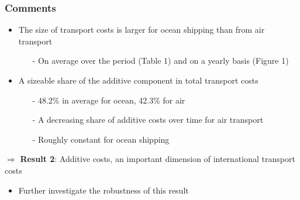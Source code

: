 \documentclass[10 pt,Helvetica, french]{beamer}
\begin{document}
\begin{frame}[label=slide_comments_fig1]
\frametitle{Comments}
\begin{itemize}
\item The size of transport costs is larger for ocean shipping than from air transport \vspace{0.1cm}
\begin{itemize}
\item[-] On average over the period (Table 1) and on a yearly basis (Figure 1) \hyperlink{app_comments_fig1}{}  \vspace{0.1cm}
\end{itemize}
\item A sizeable share of the additive component in total transport costs  \vspace{0.1cm}
\begin{itemize}
\item[-] 48.2\% in average for ocean, 42.3\% for air  \vspace{0.1cm}
\item[-] A decreasing share of additive costs over time for air transport \vspace{0.1cm}
\item[-] Roughly constant for ocean shipping
\end{itemize}
\end{itemize}
$\Rightarrow$ \textbf{Result 2}: Additive costs, an important dimension of international transport costs \vspace{0.1cm}
\begin{itemize}
\item Further investigate the robustness of this result
\end{itemize}
\end{frame}
\end{document}
